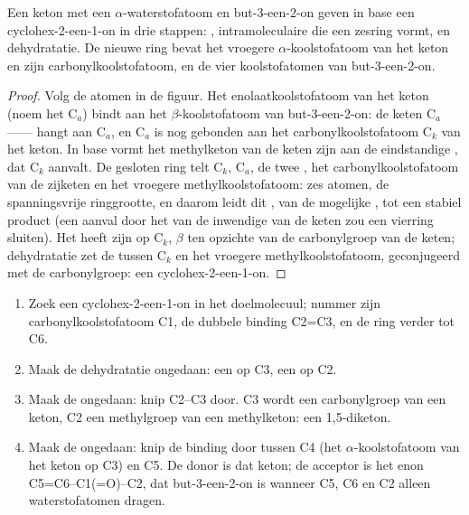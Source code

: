 \begin{proposition}[Robinsonannulatie]\label{prop:b2:conjugate-additions:robinson}
Een keton met een $\alpha$-waterstofatoom en but-3-een-2-on geven in base een cyclohex-2-een-1-on in drie
stappen: , intramoleculaire  die een zesring vormt, en dehydratatie.
De nieuwe ring bevat het vroegere $\alpha$-koolstofatoom van het keton en zijn carbonylkoolstofatoom, en de vier
koolstofatomen van but-3-een-2-on.
\end{proposition}

\begin{proof}
Volg de atomen in de figuur. Het enolaatkoolstofatoom van het keton (noem het C$_a$) bindt aan het $\beta$-koolstofatoom
van but-3-een-2-on: de keten C$_a$-------- hangt aan C$_a$, en
C$_a$ is nog gebonden aan het carbonylkoolstofatoom C$_k$ van het keton. In base vormt het methylketon van de keten
zijn  aan de eindstandige , dat C$_k$ aanvalt. De gesloten ring telt C$_k$, C$_a$,
de twee , het carbonylkoolstofatoom van de zijketen en het vroegere methylkoolstofatoom: zes atomen, de spanningsvrije
ringgrootte, en daarom leidt dit , van de mogelijke , tot een stabiel product (een
aanval door het  van de inwendige  van de keten zou een vierring sluiten). Het  heeft zijn
 op C$_k$, $\beta$ ten opzichte van de carbonylgroep van de keten; dehydratatie zet de  tussen C$_k$ en het
vroegere methylkoolstofatoom, geconjugeerd met de carbonylgroep: een cyclohex-2-een-1-on.
\end{proof}

\begin{method}\label{met:b2:conjugate-additions:robinson-disconnection}
\begin{enumerate}
  \item Zoek een cyclohex-2-een-1-on in het doelmolecuul; nummer zijn carbonylkoolstofatoom C1, de dubbele binding
        C2=C3, en de ring verder tot C6.
  \item Maak de dehydratatie ongedaan: een  op C3, een  op C2.
  \item Maak de  ongedaan: knip C2--C3 door. C3 wordt een carbonylgroep van een keton, C2 een methylgroep van een
        methylketon: een 1,5-diketon.
  \item Maak de  ongedaan: knip de binding door tussen C4 (het $\alpha$-koolstofatoom van het keton op C3) en
        C5. De donor is dat keton; de acceptor is het enon C5=C6--C1(=O)--C2, dat
        but-3-een-2-on is wanneer C5, C6 en C2 alleen waterstofatomen dragen.
\end{enumerate}
\end{method}

